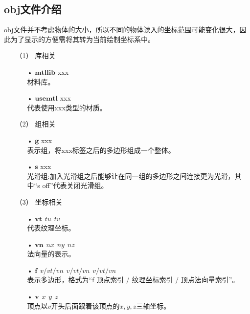 \documentclass[10pt]{article}
\begin{document}
\subsection{obj文件介绍}
obj文件并不考虑物体的大小，所以不同的物体读入的坐标范围可能变化很大，因此为了显示的方便需将其转为当前绘制坐标系中。
\begin{itemize}
\item[（1）]{库相关}
\begin{itemize}
\item[•]{$\bm{mtllib}$ xxx} \mbox{} \\
材料库。
\item[•]{$\bm{usemtl}$ xxx} \mbox{} \\
代表使用xxx类型的材质。
\end{itemize}

\item[（2）]{组相关} 
\begin{itemize}
\item[•]{$\bm{g}$ xxx} \mbox{} \\
表示组，将xxx标签之后的多边形组成一个整体。
\item[•]{$\bm{s}$ xxx} \mbox{} \\
光滑组:加入光滑组之后能够让在同一组的多边形之间连接更为光滑，其中“s off”代表关闭光滑组。
\end{itemize}

\item[（3）]{坐标相关}
\begin{itemize}
\item[•]{$\bm{vt} \hspace{5pt}tu \hspace{5pt} tv$} \mbox{} \\
代表纹理坐标。
\item[•]{$\bm{vn} \hspace{5pt} nx \hspace{5pt} ny \hspace{5pt} nz$} \mbox{} \\
法向量的表示。
\item[•]{$\bm{f} \hspace{5pt} v/vt/vn \hspace{5pt} v/vt/vn \hspace{5pt} v/vt/vn$}\mbox{} \\
表示多边形，格式为“f 顶点索引 / 纹理坐标索引 / 顶点法向量索引”。
\item[•]{$\bm{v} \hspace{5pt} x\hspace{5pt}y\hspace{5pt}z$} \mbox{} \\
顶点以$v$开头后面跟着该顶点的$x,y,z$三轴坐标。
\end{itemize}

\end{itemize}
\end{document}

